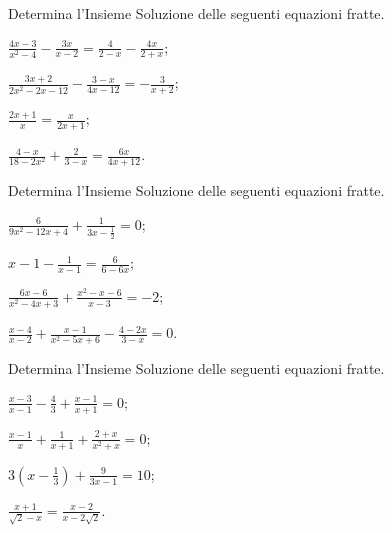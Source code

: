  \begin{esercizio}[\Ast]
\label{ese:3.38}
Determina l'Insieme Soluzione delle seguenti equazioni fratte.
\begin{multicols}{2}
\begin{enumeratea}
\item $\frac{4 x-3}{x^{2}-4}-\frac{3 x}{x-2} = \frac{4}{2-x}-\frac{4 x}{2 + x}$;
\item $\frac{3 x + 2}{2 x^{2}-2 x-12}-\frac{3-x}{4 x-12} = - \frac{3}{x + 2}$;
\item $\frac{2 x + 1}{x} = \frac{x}{2 x + 1}$;
\item $\frac{4-x}{18-2 x^{2}} + \frac{2}{3-x} = \frac{6 x}{4 x +12}$.
\end{enumeratea}
\end{multicols}
 \end{esercizio}

\begin{esercizio}[\Ast]
\label{ese:3.39}
Determina l'Insieme Soluzione delle seguenti equazioni fratte.
\begin{multicols}{2}
\begin{enumeratea}
\item $\frac{6}{9 x^{2}-12 x + 4} + \frac{1}{3 x-\frac{1}{2}} =0$;
\item $x-1-\frac{1}{x-1} = \frac{6}{6-6 x}$;
\item $\frac{6 x-6}{x^{2}-4 x + 3} + \frac{x^{2}-x-6}{x-3}=-2$;
\item $\frac{x-4}{x-2} + \frac{x-1}{x^{2}-5 x + 6}-\frac{4 -2 x}{3-x} = 0$.
\end{enumeratea}
\end{multicols}
\end{esercizio}
\pagebreak
\begin{esercizio}[\Ast]
 \label{ese:3.40}
Determina l'Insieme Soluzione delle seguenti equazioni fratte.
\begin{multicols}{2}
\begin{enumeratea}
\item $\frac{x-3}{x-1}-\frac{4}{3} + \frac{x-1}{x + 1}=0$;
\item $\frac{x-1}{x} + \frac{1}{x + 1} + \frac{2 + x}{x^{2} + x} =0$;
\item $3 \left(x-\frac{1}{3} \right) + \frac{9}{3x-1} = 10$;
\item $\frac{x + 1}{\sqrt{2}-x} = \frac{x-2}{x-2 \sqrt{2}}$.
\end{enumeratea}
\end{multicols}
\end{esercizio}

